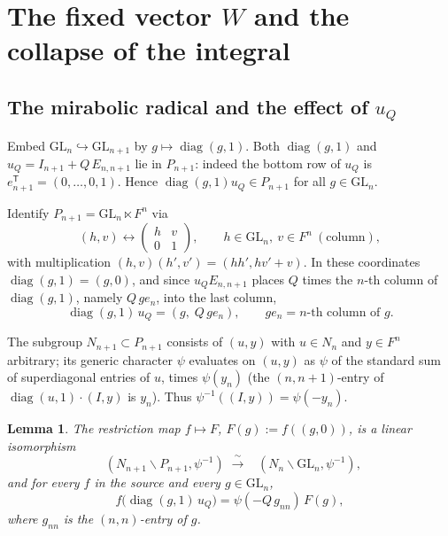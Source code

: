 \documentclass[12pt]{article}
\newcommand{\GL}{\mathrm{GL}}
\newcommand{\diag}{\operatorname{diag}}
\DeclareMathOperator{\Cc}{C_c^\infty}
\newtheorem{lemma}{Lemma}
\begin{document}
\section{The fixed vector $W$ and the collapse of the integral}

\subsection{The mirabolic radical and the effect of $u_Q$}
\label{sec:mirabolic}

Embed $\GL_n\hookrightarrow\GL_{n+1}$ by $g\mapsto\diag(g,1)$. Both $\diag(g,1)$
and $u_Q=I_{n+1}+Q\,E_{n,n+1}$ lie in $P_{n+1}$: indeed the bottom row of $u_Q$ is
$e_{n+1}^{\mathsf T}=(0,\dots,0,1)$. Hence $\diag(g,1)u_Q\in P_{n+1}$ for all
$g\in\GL_n$.

Identify $P_{n+1}=\GL_n\ltimes F^n$ via
\[
  (h,v)\longleftrightarrow\begin{pmatrix} h & v\\ 0 & 1\end{pmatrix},
  \qquad h\in\GL_n,\ v\in F^n\ (\text{column}),
\]
with multiplication $(h,v)(h',v')=(hh',hv'+v)$. In these coordinates
$\diag(g,1)=(g,0)$, and since $u_Q E_{n,n+1}$ places $Q$ times the $n$-th column of
$\diag(g,1)$, namely $Q\,g e_n$, into the last column,
\begin{equation}\label{eq:uQ}
  \diag(g,1)\,u_Q=(g,\;Q\,g e_n),\qquad g e_n=\text{$n$-th column of }g.
\end{equation}

The subgroup $N_{n+1}\subset P_{n+1}$ consists of $(u,y)$ with $u\in N_n$ and
$y\in F^n$ arbitrary; its generic character $\psi$ evaluates on $(u,y)$ as
$\psi$ of the standard sum of superdiagonal entries of $u$, times $\psi(y_n)$
(the $(n,n+1)$-entry of $\diag(u,1)\cdot(I,y)$ is $y_n$). Thus
$\psi^{-1}((I,y))=\psi(-y_n)$.

\begin{lemma}\label{lem:Cc-iso}
The restriction map $f\mapsto F$, $F(g):=f((g,0))$, is a linear isomorphism
\[
  \Cc(N_{n+1}\backslash P_{n+1},\psi^{-1})\;\xrightarrow{\ \sim\ }\;
  \Cc(N_n\backslash \GL_n,\psi^{-1}),
\]
and for every $f$ in the source and every $g\in\GL_n$,
\begin{equation}\label{eq:twist}
  f\bigl(\diag(g,1)\,u_Q\bigr)=\psi(-Q\,g_{nn})\,F(g),
\end{equation}
where $g_{nn}$ is the $(n,n)$-entry of $g$.
\end{lemma}
\end{document}
